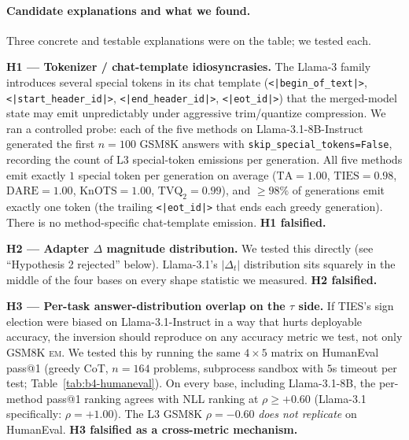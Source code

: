 \paragraph{Candidate explanations and what we found.}
Three concrete and testable explanations were on the table; we
tested each.

\textbf{H1 --- Tokenizer / chat-template idiosyncrasies.} The
Llama-3 family introduces several special tokens in its chat
template (\verb!<|begin_of_text|>!,
\verb!<|start_header_id|>!, \verb!<|end_header_id|>!,
\verb!<|eot_id|>!) that the merged-model state may emit
unpredictably under aggressive trim/quantize compression.
We ran a controlled probe: each of the five methods on
Llama-3.1-8B-Instruct generated the first $n=100$ GSM8K answers
with \verb|skip_special_tokens=False|, recording the count of
L3 special-token emissions per generation. All five methods
emit exactly $1$ special token per generation on average
($\mathrm{TA}{=}1.00$, $\mathrm{TIES}{=}0.98$,
$\mathrm{DARE}{=}1.00$, $\mathrm{KnOTS}{=}1.00$,
$\mathrm{TVQ}_2{=}0.99$), and $\geq 98\%$ of generations emit
exactly one token (the trailing \verb!<|eot_id|>! that ends each
greedy generation). There is no method-specific chat-template
emission. \textbf{H1 falsified.}

\textbf{H2 --- Adapter $\Delta$ magnitude distribution.} We
tested this directly (see ``Hypothesis 2 rejected'' below).
Llama-3.1's $|\Delta_t|$ distribution sits squarely in the
middle of the four bases on every shape statistic we measured.
\textbf{H2 falsified.}

\textbf{H3 --- Per-task answer-distribution overlap on the
$\tau$ side.} If TIES's sign election were biased on
Llama-3.1-Instruct in a way that hurts deployable accuracy,
the inversion should reproduce on any accuracy metric we test,
not only GSM8K \textsc{em}. We tested this by running the same
$4 \times 5$ matrix on HumanEval pass@1 (greedy CoT, $n = 164$
problems, subprocess sandbox with $5$s timeout per test;
Table~\ref{tab:b4-humaneval}). On every base, including
Llama-3.1-8B, the per-method pass@1 ranking agrees with NLL
ranking at $\rho \geq +0.60$ (Llama-3.1 specifically:
$\rho = +1.00$). The L3 GSM8K $\rho = -0.60$ \emph{does not
replicate} on HumanEval. \textbf{H3 falsified as a
cross-metric mechanism.}

